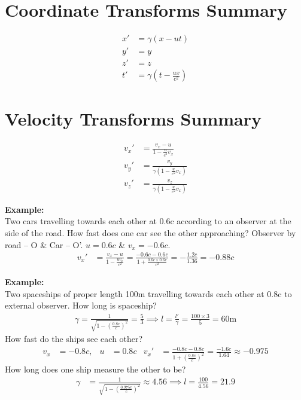 \documentclass[a4paper, 11pt, normalem]{report}
\begin{document}
\section{Coordinate Transforms Summary}
\begin{align}
    x' &= \gamma(x - ut) \\
    y' &= y \\
    z' &= z \\
    t' &= \gamma(t - \frac{ux}{c^2})
\end{align}

\section{Velocity Transforms Summary}
\begin{align}
    v_{x}' &= \frac{v_{x} - u}{1 - \tfrac{u}{c^{2}}v_{x}} \\
    v_{y}' &= \frac{v_{y}}{\gamma(1 - \tfrac{u}{c^{2}}v_{x})} \\
    v_{z}' &= \frac{v_{z}}{\gamma(1 - \tfrac{u}{c^{2}}v_{x})}
\end{align}

\textbf{Example:}\\
Two cars travelling towards each other at 0.6c according to an observer at the side of the road.
How fast does one car see the other approaching? 
Observer by road -- O \& Car -- O'.
$u = 0.6c$ \& $v_{x} = -0.6c$.
\begin{align}
    v_{x}' &= \frac{v_{x} - u}{1 - \tfrac{uv_{x}}{c^{2}}} = \frac{-0.6c - 0.6c}{1 + \tfrac{0.6c\times0.6c}{c^{2}}} = -\frac{1.2c}{1.36} = -0.88c
\end{align}

\textbf{Example:}\\
Two spaceships of proper length 100m travelling towards each other at 0.8c to external observer.
How long is spaceship?
\begin{align}
    \gamma = \frac{1}{\sqrt{1 - (\tfrac{0.8c}{c})^{2}}} = \frac{5}{3} \implies l = \frac{l'}{\gamma} = \frac{100\times3}{5} = 60\text{m}
\end{align}
How fast do the ships see each other?
\begin{align}
    v_{x} &= -0.8c, & u &= 0.8c & v_{x}' &= \frac{-0.8c - 0.8c}{1 + (\tfrac{0.8c}{c})^{2}} = \frac{-1.6c}{1.64} \approx -0.975
\end{align}
How long does one ship measure the other to be?
\begin{align}
    \gamma &= \frac{1}{\sqrt{1 - (\tfrac{0.975c}{c})^{2}}} \approx 4.56  \implies l = \frac{100}{4.56} = 21.9
\end{align}
\end{document}
